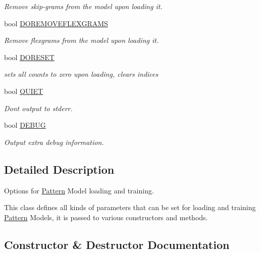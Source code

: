 \begin{DoxyCompactItemize}
\begin{DoxyCompactList}\small\item\em Remove skip-\/grams from the model upon loading it. \end{DoxyCompactList}\item 
bool \hyperlink{classPatternModelOptions_a82fad4131fd2b0a41a81f65586ae9378}{D\+O\+R\+E\+M\+O\+V\+E\+F\+L\+E\+X\+G\+R\+A\+M\+S}
\begin{DoxyCompactList}\small\item\em Remove flexgrams from the model upon loading it. \end{DoxyCompactList}\item 
bool \hyperlink{classPatternModelOptions_a52b76b6c81b7666c997ca05bc1df7e97}{D\+O\+R\+E\+S\+E\+T}
\begin{DoxyCompactList}\small\item\em sets all counts to zero upon loading, clears indices \end{DoxyCompactList}\item 
bool \hyperlink{classPatternModelOptions_ad99d007239e6ef18a6fd8ce51fb9d1bd}{Q\+U\+I\+E\+T}
\begin{DoxyCompactList}\small\item\em Don\textquotesingle{}t output to stderr. \end{DoxyCompactList}\item 
bool \hyperlink{classPatternModelOptions_ae0019dce9d441e011dab04dea4fa8d46}{D\+E\+B\+U\+G}
\begin{DoxyCompactList}\small\item\em Output extra debug information. \end{DoxyCompactList}\end{DoxyCompactItemize}


\subsection{Detailed Description}
Options for \hyperlink{classPattern}{Pattern} Model loading and training. 

This class defines all kinds of parameters that can be set for loading and training \hyperlink{classPattern}{Pattern} Models, it is passed to various constructors and methods. 

\subsection{Constructor \& Destructor Documentation}
\hypertarget{classPatternModelOptions_a32b803262231539a8cd3d715dea7ee81}{}
